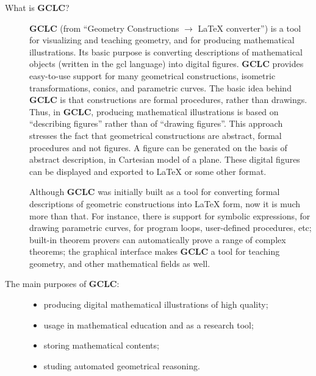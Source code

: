 \documentclass[a4paper]{book}
\newcommand{\gclc}{{\bfseries GCLC}\xspace}
\begin{document}
\begin{description}
\item[What is \gclc?]
\gclc{} (from ``Geometry Constructions $\rightarrow$ \LaTeX{} converter'')
is a tool for visualizing and teaching geometry, and for producing mathematical 
illustrations. Its basic purpose is converting descriptions of mathematical 
objects (written in the {\sc gcl} language) into digital figures. \gclc 
provides easy-to-use support for many geometrical constructions, isometric 
transformations, conics, and parametric curves. The basic idea behind \gclc 
is that constructions are formal procedures, rather than drawings.
Thus, in \gclc, producing mathematical illustrations is based on
``describing figures'' rather than of ``drawing figures''. This approach 
stresses the fact that geometrical constructions are abstract, formal 
procedures and not figures. A figure can be generated on the basis of 
abstract description, in Cartesian model of a plane. These digital figures 
can be displayed and exported to \LaTeX{} or some other format.

Although \gclc was initially built as a tool for converting formal
descriptions of geometric constructions into \LaTeX{} form, now it
is much more than that. For instance, there is support for symbolic
expressions, for drawing parametric curves, for program loops,
user-defined procedures, etc;
built-in theorem provers can automatically prove a range of
complex theorems; the graphical interface makes \gclc a tool for 
teaching geometry, and other mathematical fields as well.

\item[The main purposes of \gclc:] \hfill
\begin{itemize}
\item producing digital mathematical illustrations of high quality;
\item usage in mathematical education and as a research tool;
\item storing mathematical contents;
\item studing automated geometrical reasoning.
\end{itemize}


\end{description}
\end{document}
